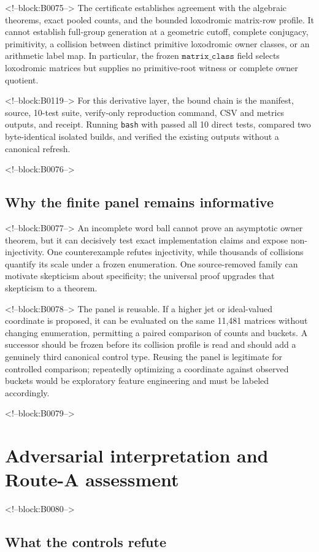 \documentclass[11pt,a4paper]{article}
\theoremstyle{definition}
\theoremstyle{remark}
\begin{document}
<!--block:B0075-->
The certificate establishes agreement with the algebraic theorems, exact pooled counts, and the bounded loxodromic matrix-row profile. It cannot establish full-group generation at a geometric cutoff, complete conjugacy, primitivity, a collision between distinct primitive loxodromic owner classes, or an arithmetic label map. In particular, the frozen \(\texttt{matrix\_class}\) field selects loxodromic matrices but supplies no primitive-root witness or complete owner quotient.

<!--block:B0119-->
For this derivative layer, the bound chain is the manifest, source, 10-test suite, verify-only reproduction command, CSV and metrics outputs, and receipt. Running \texttt{bash} with  passed all 10 direct tests, compared two byte-identical isolated builds, and verified the existing outputs without a canonical refresh.

<!--block:B0076-->
\subsection{Why the finite panel remains informative}

<!--block:B0077-->
An incomplete word ball cannot prove an asymptotic owner theorem, but it can decisively test exact implementation claims and expose non-injectivity. One counterexample refutes injectivity, while thousands of collisions quantify its scale under a frozen enumeration. One source-removed family can motivate skepticism about specificity; the universal proof upgrades that skepticism to a theorem.

<!--block:B0078-->
The panel is reusable. If a higher jet or ideal-valued coordinate is proposed, it can be evaluated on the same 11,481 matrices without changing enumeration, permitting a paired comparison of counts and buckets. A successor should be frozen before its collision profile is read and should add a genuinely third canonical control type. Reusing the panel is legitimate for controlled comparison; repeatedly optimizing a coordinate against observed buckets would be exploratory feature engineering and must be labeled accordingly.

<!--block:B0079-->
\section{Adversarial interpretation and Route-A assessment}

<!--block:B0080-->
\subsection{What the controls refute}
\end{document}
